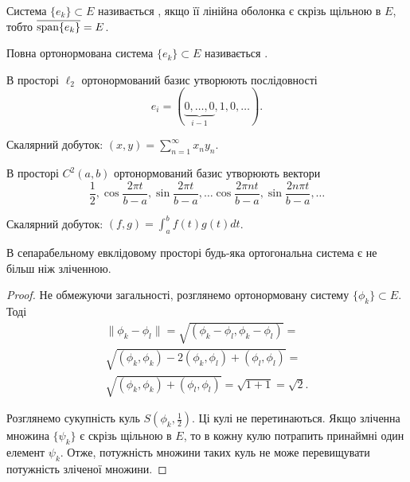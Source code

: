 \begin{definition}
Система $\{e_k\} \subset E$ називається ,
якщо її лінійна оболонка є скрізь щільною в $E$, тобто
$\overline{\operatorname{span} \{e_k\}} = E$.
\end{definition}

\begin{definition}
Повна ортонормована система $\{e_k\} \subset E$
називається .
\end{definition}

\begin{example}
В просторі $\ell_2$ ортонормований базис
утворюють послідовності
\begin{equation*}
    e_i = (\underset{i - 1}{\underbrace{0, \dots, 0}}, 1, 0, \dots).
\end{equation*}

Скалярний добуток: $(x, y) = \sum_{n = 1}^\infty x_n y_n$.
\end{example}

\begin{example}  %
В просторі $C^2(a, b)$ ортонормований
базис утворюють вектори
\begin{equation*}
    \frac{1}{2}, \cos \frac{2 \pi t}{b - a}, \sin \frac{2 \pi t}{b - a}, \dots
    \cos \frac{2 \pi n t}{b - a}, \sin \frac{2 n \pi t}{b - a}, \dots
\end{equation*}

Скалярний добуток: $(f, g) = \int_a^b f(t) g (t) dt$.
\end{example}

\begin{lemma}
В сепарабельному евклідовому просторі будь-яка
ортогональна система є не більш ніж зліченною.
\end{lemma}

\begin{proof}
Не обмежуючи загальності, розглянемо
ортонормовану систему $\{\phi_k\} \subset E$. Тоді
\begin{multline*}
    \|\phi_k - \phi_l\| =
    \sqrt{(\phi_k - \phi_l, \phi_k - \phi_l)} = \\
    \sqrt{(\phi_k, \phi_k) - 2 (\phi_k, \phi_l) + (\phi_l, \phi_l)} = \\
    \sqrt{(\phi_k, \phi_k) + (\phi_l, \phi_l)} =
    \sqrt{1 + 1} = \sqrt{2}.
\end{multline*}

Розглянемо сукупність куль $S\left( \phi_k, \frac{1}{2} \right)$.
Ці кулі не перетинаються. Якщо зліченна множина $\{\psi_k\}$ є скрізь
щільною в $E$, то в кожну кулю потрапить принаймні один
елемент $\psi_k$. Отже, потужність множини таких куль не
може перевищувати потужність зліченої множини. 
\end{proof}

